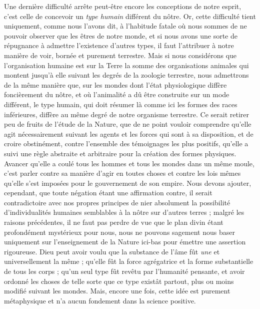 \documentclass[a4paper, 11pt, oneside]{article}
\begin{document}
Une dernière difficulté arrête peut-être encore les conceptions de notre esprit, c'est celle de concevoir un \emph{type humain} différent du nôtre. Or, cette difficulté tient uniquement, comme nous l'avons dit, à l'habitude fatale où nous sommes de ne pouvoir observer que les êtres de notre monde, et si nous avons une sorte de répugnance à admettre l'existence d'autres types, il faut l'attribuer à notre manière de voir, bornée et purement terrestre. Mais si nous considérons que l'organisation humaine est sur la Terre la somme des organisations animales qui montent jusqu'à elle suivant les degrés de la zoologie terrestre, nous admettrons de la même manière que, sur les mondes dont l'état physiologique diffère foncièrement du nôtre, et où l'animalité a dû être construite sur un mode différent, le type humain, qui doit résumer là comme ici les formes des races inférieures, diffère au même degré de notre organisme terrestre. Ce serait retirer peu de fruits de l'étude de la Nature, que de ne point vouloir comprendre qu'elle agit nécessairement suivant les agents et les forces qui sont à sa disposition, et de croire obstinément, contre l'ensemble des témoignages les plus positifs, qu'elle a suivi une règle abstraite et arbitraire pour la création des formes physiques. Avancer qu'elle a coulé tous les hommes et tous les mondes dans un même moule, c'est parler contre sa manière d'agir en toutes choses et contre les lois mêmes qu'elle s'est imposées pour le gouvernement de son empire. Nous devons ajouter, cependant, que toute négation étant une affirmation contre, il serait contradictoire avec nos propres principes de nier absolument la possibilité d'individualités humaines semblables à la nôtre sur d'autres terres ; malgré les raisons précédentes, il ne faut pas perdre de vue que le plan divin étant profondément mystérieux pour nous, nous ne pouvons sagement nous baser uniquement sur l'enseignement de la Nature ici-bas pour émettre une assertion rigoureuse. Dieu peut avoir voulu que la substance de l'âme fût \emph{une} et universellement la même ; qu'elle fût la force agrégatrice et la forme substantielle de tous les corps ; qu'un seul type fût revêtu par l'humanité pensante, et avoir ordonné les choses de telle sorte que ce type existât partout, plus ou moins modifié suivant les mondes. Mais, encore une fois, cette idée est purement métaphysique et n'a aucun fondement dans la science positive.
\end{document}
